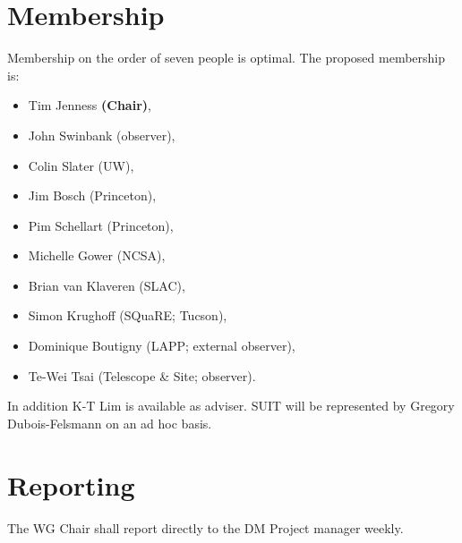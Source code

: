 \section{Membership}

Membership on the order of seven people is optimal.
The proposed membership is:

\begin{itemize}
  \item Tim Jenness \textbf{(Chair)},
  \item John Swinbank (observer),
  \item Colin Slater (UW),
  \item Jim Bosch (Princeton),
  \item Pim Schellart (Princeton),
  \item Michelle Gower (NCSA),
  \item Brian van Klaveren (SLAC),
  \item Simon Krughoff (SQuaRE; Tucson),
  \item Dominique Boutigny (LAPP; external observer),
  \item Te-Wei Tsai (Telescope \& Site; observer).
\end{itemize}

In addition K-T Lim is available as adviser.
SUIT will be represented by Gregory Dubois-Felsmann on an ad hoc basis.

\section{Reporting}

The WG Chair shall report directly to the DM Project manager weekly.
